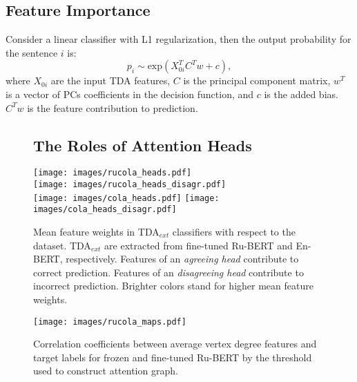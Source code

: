 \documentclass[11pt]{article}
\begin{document}
\subsection{Feature Importance}
\label{sec:feat_imp}
Consider a linear classifier with L1 regularization, then the output probability for the sentence $i$ is:
$$p_i \sim \text{exp}(X_{0i}^TC^Tw + c),$$
where $X_{0 i}$ are the input TDA features, $C$ is the principal component matrix, $w^T$ is a vector of PCs coefficients in the decision function, and $c$ is the added bias.  $C^Tw$ is the feature contribution to prediction.




\begin{figure*}
\subsection{The Roles of Attention Heads} \label{subsec:head}
\centering
\texttt{[image: images/rucola\_heads.pdf]}\\
\texttt{[image: images/rucola\_heads\_disagr.pdf]}\\
\medskip
\texttt{[image: images/cola\_heads.pdf]}
\texttt{[image: images/cola\_heads\_disagr.pdf]}
\caption{Mean feature weights in TDA$_{ext}$ classifiers with respect to the dataset. TDA$_{ext}$ are extracted from fine-tuned Ru-BERT and En-BERT, respectively. 
Features of an \textit{agreeing head} contribute to correct prediction. Features of an \textit{disagreeing head} contribute to incorrect prediction. Brighter colors stand for higher mean feature weights.}
\label{fig:attn_heads}


\centering
\texttt{[image: images/rucola\_maps.pdf]}\\
\medskip
\caption{Correlation coefficients between average vertex degree features and target labels for frozen and fine-tuned Ru-BERT by the threshold used to construct attention graph.}
\label{fig:feature_thr}
\end{figure*}
\end{document}
